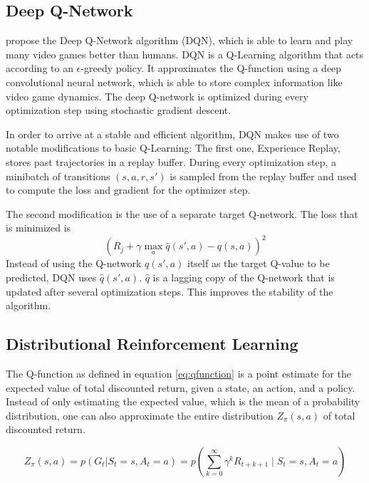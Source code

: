 \subsection{Deep Q-Network}
\cite{mnih2015HumanlevelControlDeep} propose the Deep Q-Network algorithm (DQN), which is able to learn and play many video games better than humans.
DQN is a Q-Learning algorithm that acts according to an $\epsilon$-greedy policy.
It approximates the Q-function using a deep convolutional neural network, which is able to store complex information like video game dynamics.
The deep Q-network is optimized during every optimization step using stochastic gradient descent.

In order to arrive at a stable and efficient algorithm, DQN makes use of two notable modifications to basic Q-Learning:
The first one, Experience Replay, stores past trajectories in a replay buffer.
During every optimization step, a minibatch of transitions $(s, a, r, s')$ is sampled from the replay buffer and used to compute the loss and gradient for the optimizer step.

The second modification is the use of a separate target Q-network.
The loss that is minimized is
\begin{equation}
    \left(R_j + \gamma \max_a{\hat{q}(s',a)} - q(s,a)\right)^2
\end{equation}
Instead of using the Q-network $q(s',a)$ itself as the target Q-value to be predicted, DQN uses $\hat{q}(s',a)$.
$\hat{q}$ is a lagging copy of the Q-network that is updated after several optimization steps.
This improves the stability of the algorithm.

\subsection{Distributional Reinforcement Learning}
The Q-function as defined in equation \ref{eq:qfunction} is a point estimate for the expected value of total discounted return, given a state, an action, and a policy.
Instead of only estimating the expected value, which is the mean of a probability distribution, one can also approximate the entire distribution $Z_\pi(s,a)$ of total discounted return.

\begin{equation} \label{eq:zfunction}
    Z_\pi(s,a) = p(G_t | S_t=s, A_t = a) = p\left(\sum_{k=0}^{\infty}\gamma^kR_{t+k+1} \mid S_t = s, A_t = a\right)
\end{equation}

